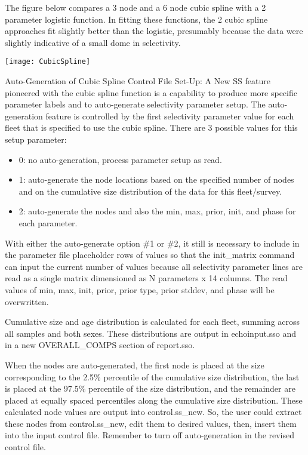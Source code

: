 	
The figure below compares a 3 node and a 6 node cubic spline with a 2 parameter logistic function.  In fitting these functions, the 2 cubic spline approaches fit slightly better than the logistic, presumably because the data were slightly indicative of a small dome in selectivity.
	\begin{center}
		\texttt{[image: CubicSpline]}
	\end{center}
	
Auto-Generation of Cubic Spline Control File Set-Up: A New SS feature pioneered with the cubic spline function is a capability to produce more specific parameter labels and to auto-generate selectivity parameter setup.  The auto-generation feature is controlled by the first selectivity parameter value for each fleet that is specified to use the cubic spline.  There are 3 possible values for this setup parameter:
	\begin{itemize}
		\item 0: no auto-generation, process parameter setup as read.
		\item 1: auto-generate the node locations based on the specified number of nodes and on the cumulative size distribution of the data for this fleet/survey.
		\item 2: auto-generate the nodes and also the min, max, prior, init, and phase for each parameter.
	\end{itemize}
	
With either the auto-generate option \#1 or \#2, it still is necessary to include in the parameter file placeholder rows of values so that the init\_matrix command can input the current number of values because all selectivity parameter lines are read as a single matrix dimensioned as N parameters x 14 columns.  The read values of min, max, init, prior, prior type, prior stddev, and phase will be overwritten.
	
Cumulative size and age distribution is calculated for each fleet, summing across all samples and both sexes.  These distributions are output in echoinput.sso and in a new OVERALL\_COMPS section of report.sso.
	
When the nodes are auto-generated, the first node is placed at the size corresponding to the 2.5\% percentile of the cumulative size distribution, the last is placed at the 97.5\% percentile of the size distribution, and the remainder are placed at equally spaced percentiles along the cumulative size distribution.  These calculated node values are output into control.ss\_new.  So, the user could extract these nodes from control.ss\_new, edit them to desired values, then, insert them into the input control file.  Remember to turn off auto-generation in the revised control file.
	
